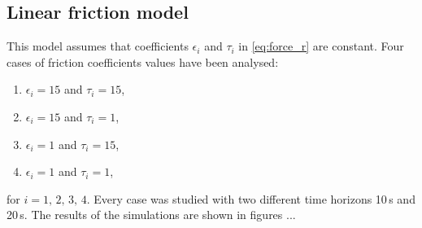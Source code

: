 \subsection{Linear friction model}
This model assumes that coefficients $\epsilon_i$ and $\tau_i$ in \eqref{eq:force_r} are constant. Four cases of friction coefficients values have been analysed:
\begin{enumerate}
\item $\epsilon_i=15$ and $\tau_i=15$,
\item $\epsilon_i=15$ and $\tau_i=1$,
\item $\epsilon_i=1$ and $\tau_i=15$,
\item $\epsilon_i=1$ and $\tau_i=1$,
\end{enumerate}
for $i=1,\,2,\,3,\,4$.
Every case was studied with two different time horizons 10\,s and 20\,s. The results of the simulations are shown in figures ...

